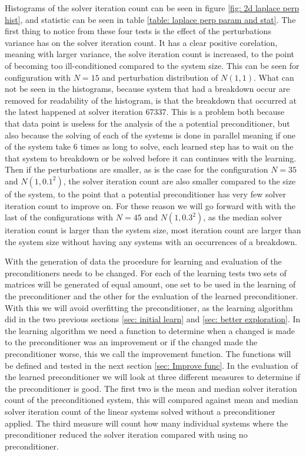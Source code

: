 Histograms of the solver iteration count can be seen in figure \ref{fig: 2d laplace perp hist}, and statistic can be seen in table \ref{table: laplace perp param and stat}. The first thing to notice from these four tests is the effect of the perturbations variance has on the solver iteration count. It has a clear positive corelation, meaning with larger variance, the solve iteration count is increased, to the point of becoming too ill-conditioned compared to the system size. This can be seen for configuration with \(N=15\) and perturbation distribution of \(N(1,1)\). What can not be seen in the histograms, because system that had a breakdown occur are removed for readability of the histogram, is that the breakdown that occurred at the latest happened at solver iteration 67337. This is a problem both because that data point is useless for the analysis of the a potential preconditioner, but also because the solving of each of the systems is done in parallel meaning if one of the system take 6 times as long to solve, each learned step has to wait on the that system to breakdown or be solved before it can continues with the learning. Then if the perturbations are smaller, as is the case for the configuration \(N=35\) and \(N(1,0.1^2)\), the solver iteration count are also smaller compared to the size of the system, to the point that a potential preconditioner has very few solver iteration count to improve on. For these reason we will go forward with with the last of the configurations with \(N=45\) and \(N(1,0.3^2)\), as the median solver iteration count is larger than the system size, most iteration count are larger than the system size without having any systems with an occurrences of a breakdown.

With the generation of data the procedure for learning and evaluation of the preconditioners needs to be changed. For each of the learning tests two sets of matrices will be generated of equal amount, one set to be used in the learning of the preconditioner and the other for the evaluation of the learned preconditioner. With this we will avoid overfitting the preconditioner, as the learning algorithm did in the two previous sections \ref{sec: initial learn} and \ref{sec: better exploration}. In the learning algorithm we need a function to determine when a changed is made to the preconditioner was an improvement or if the changed made the preconditioner worse, this we call the improvement function. The functions will be defined and tested in the next section \ref{sec: Improve func}. In the evaluation of the learned preconditioner we will look at three different measures to determine if the preconditioner is good. The first two is the mean and median solver iteration count of the preconditioned system, this will compared against mean and median solver iteration count of the linear systems solved without a preconditioner applied. The third measure will count how many individual systems where the preconditioner reduced the solver iteration compared with using no preconditioner.